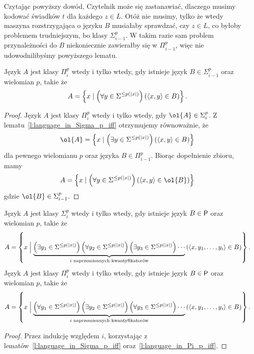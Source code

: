 \begin{remark*}
    Czytając powyższy dowód, Czytelnik może się zastanawiać, dlaczego musimy kodować świadków $t$ dla każdego $z \in L$. Otóż nie musimy, tylko że wtedy maszyna rozstrzygająca o języku $B$ musiałaby sprawdzać, czy $z \in L$, co byłoby problemem trudniejszym, bo klasy $\Sigma_{i-1}^p$. W takim razie sam problem przynależności do $B$ niekoniecznie zawierałby się w $\Pi_{i-1}^p$, więc nie udowodnilibyśmy powyższego lematu.
\end{remark*}

\begin{lemma}\label{l:language_in_Pi_p_iff}
    Język $A$ jest klasy $\Pi_i^p$ wtedy i tylko wtedy, gdy istnieje język $B \in \Sigma_{i-1}^p$ oraz wielomian $p$, takie że
    \[ A = \left\{x \mid \left(\forall y \in \Sigma^{\leq p(|x|)}\right) \left(\left\langle x, y \right\rangle \in B\right) \right\}. \]
\end{lemma}
\begin{proof}
    Język $A$ jest klasy $\Pi_i^p$ wtedy i tylko wtedy, gdy $\ol{A} \in \Sigma_i^p$. Z lematu~\ref{l:language_in_Sigma_p_iff} otrzymujemy równoważnie, że
    \[\ol{A} = \left\{x \mid \left(\exists y \in \Sigma^{\leq p(|x|)}\right) \left(\encode{x, y} \in B\right) \right\} \]
    dla pewnego wielomianu $p$ oraz języka $B \in \Pi_{i-1}^p$. Biorąc dopełnienie zbioru, mamy
    \[A = \left\{x \mid \left(\forall y \in \Sigma^{\leq p(|x|)}\right) \left(\encode{x, y} \in \ol{B}\right) \right\} \]
    gdzie $\ol{B} \in \Sigma_{i-1}^p$.
\end{proof}

\begin{theorem}\label{t:alternating_quantifiers}
    Język $A$ jest klasy $\Sigma_i^p$ wtedy i tylko wtedy, gdy istnieje język $B \in \textsf{P}$ oraz wielomian $p$, takie że
    \[ A = \left\{x \Bigm|
    \underbrace{\left(\exists y_1 \in \Sigma^{\leq p(|x|)}\right) \left(\forall y_2 \in \Sigma^{\leq p(|x|)}\right) \left(\exists y_3 \in \Sigma^{\leq p(|x|)}\right) \cdots}_{i \text{ naprzemiennych kwantyfikatorów}}
    \left(\left\langle x, y_1, \ldots, y_i \right\rangle \in B\right)\right\}. \]
    Język $A$ jest klasy $\Pi_i^p$ wtedy i tylko wtedy, gdy istnieje język $B \in \textsf{P}$ oraz wielomian $p$, takie że
    \[ A = \left\{x \Bigm|
    \underbrace{\left(\forall y_1 \in \Sigma^{\leq p(|x|)}\right) \left(\exists y_2 \in \Sigma^{\leq p(|x|)}\right) \left(\forall y_3 \in \Sigma^{\leq p(|x|)}\right) \cdots}_{i \text{ naprzemiennych kwantyfikatorów}}
    \left(\left\langle x, y_1, \ldots, y_i \right\rangle \in B\right)\right\}. \]
\end{theorem}
\begin{proof}
    Przez indukcję względem $i$, korzystając z lematów~\ref{l:language_in_Sigma_p_iff} oraz~\ref{l:language_in_Pi_p_iff}.
\end{proof}

